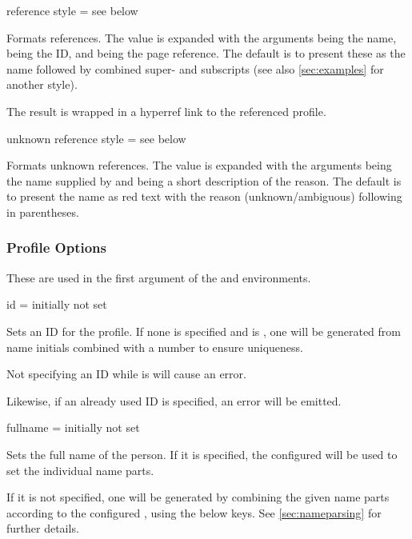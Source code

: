 \documentclass[
	a4paper,
]{article}
\begin{document}
\begin{docKey}
	{reference style}
	{=}
	{see below}

	Formats references. The value is expanded with the arguments  being the name,  being the ID, and  being the page reference. The default is to present these as the name followed by combined super- and subscripts (see also \cref{sec:examples} for another style).

	The result is wrapped in a hyperref link to the referenced profile.
\end{docKey}

\begin{docKey}
	{unknown reference style}
	{=}
	{see below}

	Formats unknown references. The value is expanded with the arguments  being the name supplied by  and  being a short description of the reason. The default is to present the name as red text with the reason (unknown/ambiguous) following in parentheses.
\end{docKey}


\subsubsection{Profile Options} %

\label{sec:profopts}
These are used in the first argument of the  and  environments.

\begin{docKey}
	{id}
	{=}
	{initially not set}

	Sets an ID for the profile. If none is specified and  is , one will be generated from name initials combined with a number to ensure uniqueness.

	Not specifying an ID while  is  will cause an error.

	Likewise, if an already used ID is specified, an error will be emitted.
\end{docKey}

\begin{docKey}
	{fullname}
	{=}
	{initially not set}

	Sets the full name of the person. If it is specified, the configured  will be used to set the individual name parts.

	If it is not specified, one will be generated by combining the given name parts according to the configured , using the below keys. See \cref{sec:nameparsing} for further details.
\end{docKey}
\end{document}
